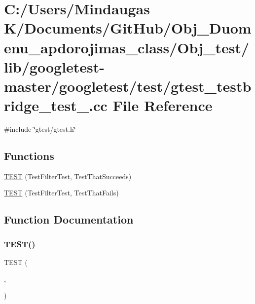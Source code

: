 \hypertarget{_obj__test_2lib_2googletest-master_2googletest_2test_2gtest__testbridge__test___8cc}{}\section{C\+:/\+Users/\+Mindaugas K/\+Documents/\+Git\+Hub/\+Obj\+\_\+\+Duomenu\+\_\+apdorojimas\+\_\+class/\+Obj\+\_\+test/lib/googletest-\/master/googletest/test/gtest\+\_\+testbridge\+\_\+test\+\_\+.cc File Reference}
\label{_obj__test_2lib_2googletest-master_2googletest_2test_2gtest__testbridge__test___8cc}
{\ttfamily \#include \char`\"{}gtest/gtest.\+h\char`\"{}}\newline
\subsection*{Functions}
\begin{DoxyCompactItemize}
\item 
\mbox{\hyperlink{_obj__test_2lib_2googletest-master_2googletest_2test_2gtest__testbridge__test___8cc_a5eeaeead411cc3c91e0eae2f2f4f5209}{T\+E\+ST}} (Test\+Filter\+Test, Test\+That\+Succeeds)
\item 
\mbox{\hyperlink{_obj__test_2lib_2googletest-master_2googletest_2test_2gtest__testbridge__test___8cc_aaaf6981970e3fe120e682eb203630242}{T\+E\+ST}} (Test\+Filter\+Test, Test\+That\+Fails)
\end{DoxyCompactItemize}


\subsection{Function Documentation}
\mbox{\label{_obj__test_2lib_2googletest-master_2googletest_2test_2gtest__testbridge__test___8cc_a5eeaeead411cc3c91e0eae2f2f4f5209}} 
\subsubsection{\texorpdfstring{TEST()}{TEST()}\hspace{0.1cm}{\footnotesize\ttfamily [1/2]}}
{\footnotesize\ttfamily T\+E\+ST (\begin{DoxyParamCaption}\item[{Test\+Filter\+Test}]{,  }\item[{Test\+That\+Succeeds}]{ }\end{DoxyParamCaption})}

